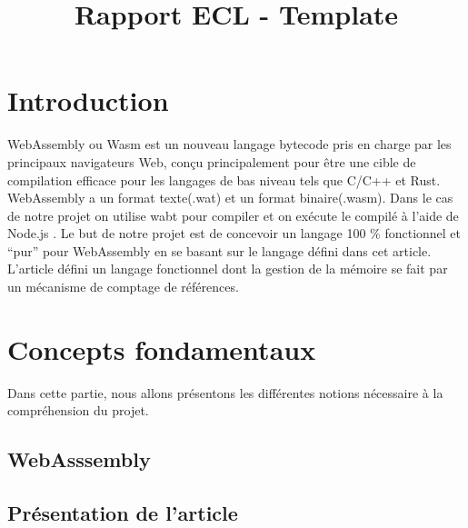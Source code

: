 \documentclass{rapportECL}
\title{Rapport ECL - Template} %
\begin{document}





\fairemarges %
\fairepagedegarde %
\tabledematieres %

\section{Introduction}
WebAssembly ou Wasm \cite{noauthor_webassembly_nodate} est un nouveau langage bytecode pris en charge par les principaux navigateurs Web, 
conçu principalement pour être une cible de compilation efficace pour les langages de bas niveau tels que C/C++ et Rust\cite{haas_bringing_2017}.
WebAssembly a un format texte(.wat) et un format binaire(.wasm). 
Dans le cas de notre projet on utilise wabt\cite{noauthor_wabt_2023} pour compiler et on exécute le compilé à l’aide de Node.js \cite{noauthor_nodejs_nodate}.
Le but de notre projet est de concevoir un langage 100 $\%$ fonctionnel et “pur” pour WebAssembly en se basant sur le langage défini dans 
cet article\cite{ullrich_counting_2020}. L'article défini un langage fonctionnel dont la gestion de la mémoire se fait par 
un mécanisme de comptage de références.

\section{Concepts fondamentaux}
Dans cette partie, nous allons présentons les différentes notions nécessaire à la compréhension du projet.
\subsection{WebAsssembly}
\subsection{Présentation de l'article}
\end{document}
